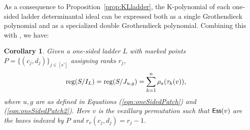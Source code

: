 \documentclass[12pt]{amsart}
\newtheorem{corollary}[theorem]{Corollary}
\theoremstyle{definition}
\theoremstyle{remark}
\numberwithin{equation}{section}
\newcommand{\Ess}{{\sf Ess}}
\newcommand{\reg}{{\rm reg}}
\newcommand{\maxsizeantidiag}{\rho_a}
\begin{document}
As a consequence to Proposition~\ref{prop:KLladder}, the K-polynomial of each one-sided ladder determinantal ideal can be expressed both as a single Grothendieck polynomial and as a specialized double Grothendieck polynomial. Combining this with \cite{Fulton.Flags}, we have:

\begin{corollary} 
	Given a one-sided ladder $L$ with marked points $P = \{(c_j,d_j)\}_{j\in[s']}$ assigning ranks $r_j$, \[\reg(S/I_L)=\reg(S/J_{u,g})=\sum_{k=1}^n \maxsizeantidiag(\tau_k(v)),\]
	where $u,g$ are as defined in Equations (\ref{eqn:oneSidedPatch}) and (\ref{eqn:oneSidedPatch2}). 
	Here $v$ is the vexillary permutation such that $\Ess{(v)}$ are the boxes indexed by $P$ and $r_v(c_j,d_j)=r_j-1$.
\end{corollary}







%  

\end{document}
